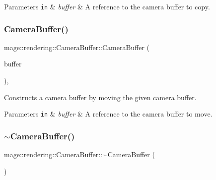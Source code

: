 \begin{DoxyParams}[1]{Parameters}
\mbox{\tt in}  & {\em buffer} & A reference to the camera buffer to copy. \\
\hline
\end{DoxyParams}
\mbox{\label{structmage_1_1rendering_1_1_camera_buffer_a16f0d0938bb4e4174461c3a8c8ad3e20}} 
\subsubsection{\texorpdfstring{Camera\+Buffer()}{CameraBuffer()}\hspace{0.1cm}{\footnotesize\ttfamily [3/3]}}
{\footnotesize\ttfamily mage\+::rendering\+::\+Camera\+Buffer\+::\+Camera\+Buffer (\begin{DoxyParamCaption}\item[{\mbox{\hyperlink{structmage_1_1rendering_1_1_camera_buffer}{Camera\+Buffer}} \&\&}]{buffer }\end{DoxyParamCaption})\hspace{0.3cm}{\ttfamily [default]}, {\ttfamily [noexcept]}}

Constructs a camera buffer by moving the given camera buffer.


\begin{DoxyParams}[1]{Parameters}
\mbox{\tt in}  & {\em buffer} & A reference to the camera buffer to move. \\
\hline
\end{DoxyParams}
\mbox{\label{structmage_1_1rendering_1_1_camera_buffer_aadd09f0ddad88a8463e8dda3ae4e3849}} 
\subsubsection{\texorpdfstring{$\sim$\+Camera\+Buffer()}{~CameraBuffer()}}
{\footnotesize\ttfamily mage\+::rendering\+::\+Camera\+Buffer\+::$\sim$\+Camera\+Buffer (\begin{DoxyParamCaption}{ }\end{DoxyParamCaption})\hspace{0.3cm}{\ttfamily [default]}}

